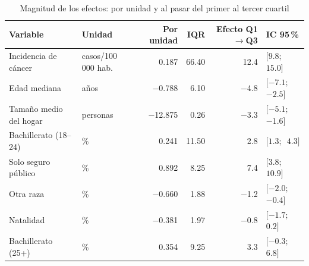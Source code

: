 \begin{table}[htbp]
\centering
\footnotesize
\caption{Magnitud de los efectos: por unidad y al pasar del primer al tercer cuartil}\label{tab:efectos}
\begin{tabularx}{\linewidth}{>{\raggedright\arraybackslash}X l r r r l}
\toprule
Variable & Unidad & Por unidad & IQR & Efecto Q1$\to$Q3 & IC 95\,\% \\
\midrule
Incidencia de cáncer & casos/100 000 hab. & \num{0.187} & \num{66.40} & \num{12.4} & $[\num{9.8};$\allowbreak\ $\num{15.0}]$ \\
Edad mediana & años & \num{-0.788} & \num{6.10} & \num{-4.8} & $[\num{-7.1};$\allowbreak\ $\num{-2.5}]$ \\
Tamaño medio del hogar & personas & \num{-12.875} & \num{0.26} & \num{-3.3} & $[\num{-5.1};$\allowbreak\ $\num{-1.6}]$ \\
Bachillerato (18–24) & \% & \num{0.241} & \num{11.50} & \num{2.8} & $[\num{1.3};$\allowbreak\ $\num{4.3}]$ \\
Solo seguro público & \% & \num{0.892} & \num{8.25} & \num{7.4} & $[\num{3.8};$\allowbreak\ $\num{10.9}]$ \\
Otra raza & \% & \num{-0.660} & \num{1.88} & \num{-1.2} & $[\num{-2.0};$\allowbreak\ $\num{-0.4}]$ \\
Natalidad & \% & \num{-0.381} & \num{1.97} & \num{-0.8} & $[\num{-1.7};$\allowbreak\ $\num{0.2}]$ \\
Bachillerato (25+) & \% & \num{0.354} & \num{9.25} & \num{3.3} & $[\num{-0.3};$\allowbreak\ $\num{6.8}]$ \\
\bottomrule
\end{tabularx}
\par{}
\end{table}
